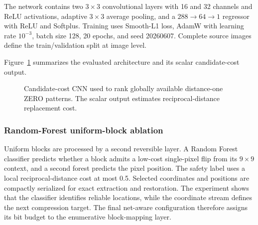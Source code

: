The network contains two $3\times3$ convolutional layers with 16 and 32
channels and ReLU activations, adaptive $3\times3$ average pooling, and a
$288\rightarrow64\rightarrow1$ regressor with ReLU and Softplus. Training uses
Smooth-L1 loss, AdamW with learning rate $10^{-3}$, batch size 128, 20 epochs,
\RevisionAddBegin
and seed 20260607. Complete source images define the train/validation split at
image level.
\RevisionAddEnd

Figure~\ref{fig:cnn-architecture} summarizes the evaluated architecture and
its scalar candidate-cost output.

\begin{figure}[t]
\centering
{}
\caption{Candidate-cost CNN used to rank globally available distance-one ZERO
patterns. The scalar output estimates reciprocal-distance replacement cost.}
\label{fig:cnn-architecture}
\end{figure}

\subsubsection*{Random-Forest uniform-block ablation}
\label{subsec:rf-layer}

Uniform blocks are processed by a second reversible layer. A Random Forest
classifier predicts whether a block admits a low-cost single-pixel flip from
its $9\times9$ context, and a second forest predicts the pixel position. The
\RevisionAddBegin
safety label uses a local reciprocal-distance cost at most 0.5.
\RevisionAddEnd
Selected coordinates and positions are compactly serialized for exact
extraction and restoration. The experiment shows that the classifier
identifies reliable locations, while the coordinate stream defines the next
compression target. The final net-aware configuration therefore assigns its
bit budget to the enumerative block-mapping layer.

